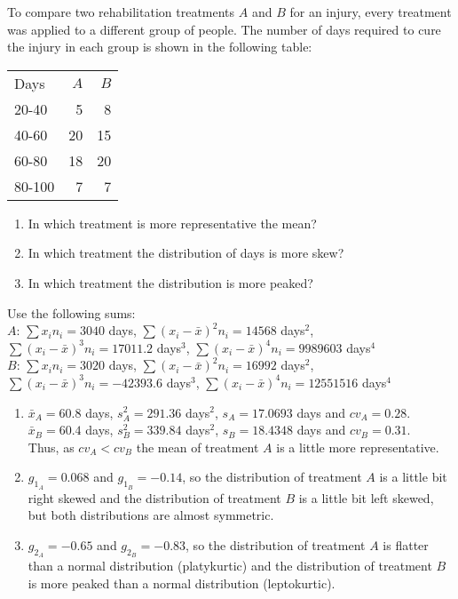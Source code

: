 {To compare two rehabilitation treatments $A$ and $B$ for an injury, every treatment was applied to a different
group of people. The number of days required to cure the injury in each group is shown in the following table:
\begin{center}
\begin{tabular}{lrr}
\toprule
Days & $A$ & $B$ \\
20-40 & 5 & 8 \\
40-60 & 20 & 15 \\
60-80 & 18 & 20 \\
80-100 & 7 & 7 \\
\bottomrule
\end{tabular}
\end{center}

\begin{enumerate}
\item In which treatment is more representative the mean?
\item In which treatment the distribution of days is more skew?
\item In which treatment the distribution is more peaked?
\end{enumerate}

Use the following sums:\\
$A$: $\sum x_in_i= 3040$ days, $\sum (x_i-\bar x)^2n_i=14568$ days$^2$, $\sum (x_i-\bar x)^3n_i=17011.2$ days$^3$, $\sum
(x_i-\bar x)^4n_i=9989603$ days$^4$\\
$B$: $\sum x_in_i= 3020$ days, $\sum (x_i-\bar x)^2n_i=16992$ days$^2$, $\sum (x_i-\bar x)^3n_i=-42393.6$ days$^3$, $\sum
(x_i-\bar x)^4n_i=12551516$ days$^4$
}
{\begin{enumerate}
\item $\bar x_A=60.8$ days, $s^2_A=291.36$ days$^2$, $s_A=17.0693$ days and $cv_A = 0.28$.\\
$\bar x_B=60.4$ days, $s^2_B=339.84$ days$^2$, $s_B=18.4348$ days and $cv_B = 0.31$.\\
Thus, as $cv_A<cv_B$ the mean of treatment $A$ is a little more representative.
\item $g_{1_A} = 0.068$ and $g_{1_B} = -0.14$, so the distribution of treatment $A$ is a little bit right skewed and the distribution of treatment $B$ is a little bit left skewed, but both distributions are almost symmetric.
\item $g_{2_A}=-0.65$ and $g_{2_B}=-0.83$, so the distribution of treatment $A$ is flatter than a normal distribution (platykurtic) and the distribution of treatment $B$ is more peaked than a normal distribution (leptokurtic).
\end{enumerate}
}
{}


